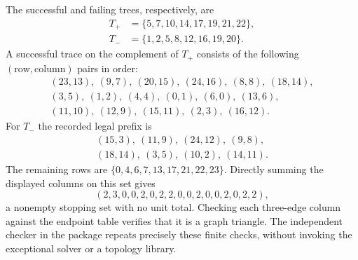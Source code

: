 The successful and failing trees, respectively, are
\begin{align*}
T_+&=\{5,7,10,14,17,19,21,22\},\\
T_-&=\{1,2,5,8,12,16,19,20\}.
\end{align*}
A successful trace on the complement of $T_+$ consists of the following
$(\text{row},\text{column})$ pairs in order:
\[
\begin{gathered}
(23,13),\ (9,7),\ (20,15),\ (24,16),\ (8,8),\ (18,14),\\
(3,5),\ (1,2),\ (4,4),\ (0,1),\ (6,0),\ (13,6),\\
(11,10),\ (12,9),\ (15,11),\ (2,3),\ (16,12).
\end{gathered}
\]
For $T_-$ the recorded legal prefix is
\[
\begin{gathered}
(15,3),\ (11,9),\ (24,12),\ (9,8),\\
(18,14),\ (3,5),\ (10,2),\ (14,11).
\end{gathered}
\]
The remaining rows are $\{0,4,6,7,13,17,21,22,23\}$.  Directly summing
the displayed columns on this set gives
\[
(2,3,0,0,2,0,2,2,0,0,2,0,0,2,0,2,2),
\]
a nonempty stopping set with no unit total.  Checking each three-edge
column against the endpoint table verifies that it is a graph triangle.
The independent checker in the package repeats precisely these finite
checks, without invoking the exceptional solver or a topology library.
